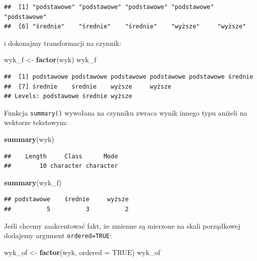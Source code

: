 \documentclass[]{book}
\newenvironment{Shaded}{\begin{snugshade}}{\end{snugshade}}
\newcommand{\KeywordTok}[1]{\textcolor[rgb]{0.13,0.29,0.53}{\textbf{#1}}}
\newcommand{\DataTypeTok}[1]{\textcolor[rgb]{0.13,0.29,0.53}{#1}}
\newcommand{\StringTok}[1]{\textcolor[rgb]{0.31,0.60,0.02}{#1}}
\newcommand{\OtherTok}[1]{\textcolor[rgb]{0.56,0.35,0.01}{#1}}
\newcommand{\NormalTok}[1]{#1}
\begin{document}
\begin{verbatim}
##  [1] "podstawowe" "podstawowe" "podstawowe" "podstawowe" "podstawowe"
##  [6] "średnie"    "średnie"    "średnie"    "wyższe"     "wyższe"
\end{verbatim}

i dokonajmy transformacji na czynnik:

\begin{Shaded}
\begin{Highlighting}[]
\NormalTok{wyk_f <-}\StringTok{ }\KeywordTok{factor}\NormalTok{(wyk)}
\NormalTok{wyk_f}
\end{Highlighting}
\end{Shaded}

\begin{verbatim}
##  [1] podstawowe podstawowe podstawowe podstawowe podstawowe średnie   
##  [7] średnie    średnie    wyższe     wyższe    
## Levels: podstawowe średnie wyższe
\end{verbatim}

Funkcja \texttt{summary()} wywołana na czynniku zwraca wynik innego typu
aniżeli na wektorze tekstowym:

\begin{Shaded}
\begin{Highlighting}[]
\KeywordTok{summary}\NormalTok{(wyk)}
\end{Highlighting}
\end{Shaded}

\begin{verbatim}
##    Length     Class      Mode 
##        10 character character
\end{verbatim}

\begin{Shaded}
\begin{Highlighting}[]
\KeywordTok{summary}\NormalTok{(wyk_f)}
\end{Highlighting}
\end{Shaded}

\begin{verbatim}
## podstawowe    średnie     wyższe 
##          5          3          2
\end{verbatim}

Jeśli chcemy zaakcentować fakt, że zmienne są mierzone na skali
porządkowej dodajemy argument \texttt{ordered=TRUE}:

\begin{Shaded}
\begin{Highlighting}[]
\NormalTok{wyk_of <-}\StringTok{ }\KeywordTok{factor}\NormalTok{(wyk, }\DataTypeTok{ordered =} \OtherTok{TRUE}\NormalTok{)}
\NormalTok{wyk_of}
\end{Highlighting}
\end{Shaded}
\end{document}
